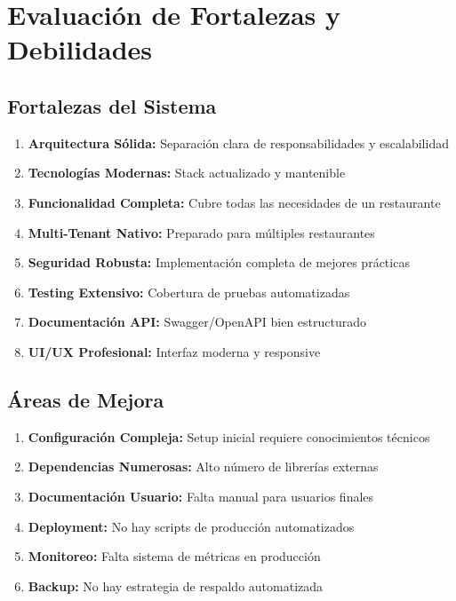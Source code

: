 \documentclass[12pt,a4paper]{article}
\begin{document}
\section{Evaluación de Fortalezas y Debilidades}

\subsection{Fortalezas del Sistema}

\begin{enumerate}
    \item \textcolor{secondarygreen}{\textbf{Arquitectura Sólida:}} Separación clara de responsabilidades y escalabilidad
    \item \textcolor{secondarygreen}{\textbf{Tecnologías Modernas:}} Stack actualizado y mantenible
    \item \textcolor{secondarygreen}{\textbf{Funcionalidad Completa:}} Cubre todas las necesidades de un restaurante
    \item \textcolor{secondarygreen}{\textbf{Multi-Tenant Nativo:}} Preparado para múltiples restaurantes
    \item \textcolor{secondarygreen}{\textbf{Seguridad Robusta:}} Implementación completa de mejores prácticas
    \item \textcolor{secondarygreen}{\textbf{Testing Extensivo:}} Cobertura de pruebas automatizadas
    \item \textcolor{secondarygreen}{\textbf{Documentación API:}} Swagger/OpenAPI bien estructurado
    \item \textcolor{secondarygreen}{\textbf{UI/UX Profesional:}} Interfaz moderna y responsive
\end{enumerate}

\subsection{Áreas de Mejora}

\begin{enumerate}
    \item \textcolor{warningorange}{\textbf{Configuración Compleja:}} Setup inicial requiere conocimientos técnicos
    \item \textcolor{warningorange}{\textbf{Dependencias Numerosas:}} Alto número de librerías externas
    \item \textcolor{warningorange}{\textbf{Documentación Usuario:}} Falta manual para usuarios finales
    \item \textcolor{warningorange}{\textbf{Deployment:}} No hay scripts de producción automatizados
    \item \textcolor{warningorange}{\textbf{Monitoreo:}} Falta sistema de métricas en producción
    \item \textcolor{warningorange}{\textbf{Backup:}} No hay estrategia de respaldo automatizada
\end{enumerate}
\end{document}
